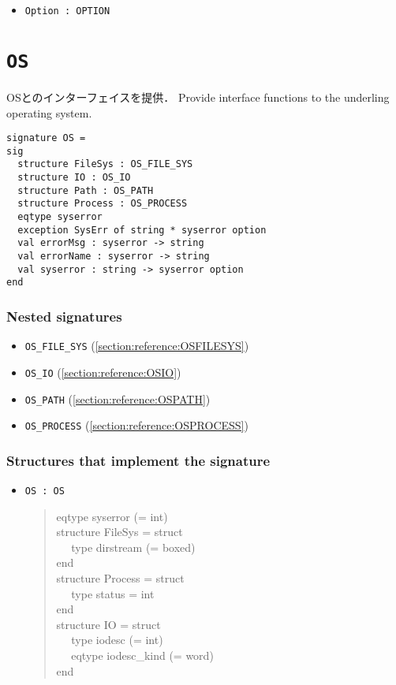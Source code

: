 \documentclass{jbook}
\newcommand{\txt}[2]{#2}
\newcommand{\code}[1]{\mbox{\large\tt #1}}
\newcommand{\myem}{\mbox{\ \ }}
\newenvironment{program}{\begin{quote}\begin{tt}}%
                        {\end{tt}\end{quote}}
\newcommand{\structure}[1]{
\section{{\tt #1}}\label{section:reference:#1}
}
\newcommand{\signature}[2]{
\section{{\tt #1}}\label{section:reference:#2}
}
\newcommand{\sigref}[1]{\ref{section:reference:#1}}
\newcommand{\Structure}{\subsubsection*{\txt{シグネチャを実装するストラクチャ}{Structures that implement the signature}}}
\newcommand{\NestedSignature}{\subsubsection*{\txt{ネストしたシグネチャ}{Nested signatures}}}
\begin{document}
\begin{itemize}
\item \code{Option : OPTION}
\end{itemize}

\signature{OS}{OS}
\ifjp%
	OSとのインターフェイスを提供．
\else%
	Provide interface functions to the underling operating system.
\fi%

\begin{verbatim}
signature OS =
sig
  structure FileSys : OS_FILE_SYS
  structure IO : OS_IO
  structure Path : OS_PATH
  structure Process : OS_PROCESS
  eqtype syserror
  exception SysErr of string * syserror option
  val errorMsg : syserror -> string
  val errorName : syserror -> string
  val syserror : string -> syserror option
end
\end{verbatim}

\NestedSignature
\begin{itemize}
\item 
\code{OS\_FILE\_SYS}
(\sigref{OSFILESYS})
\item 
\code{OS\_IO}
(\sigref{OSIO})
\item 
\code{OS\_PATH}
(\sigref{OSPATH})
\item 
\code{OS\_PROCESS}
(\sigref{OSPROCESS})
\end{itemize}

\Structure
\begin{itemize}
\item \code{OS : OS}
\begin{program}
  eqtype syserror (= int)
\\
  structure FileSys = struct
\\\myem
    type dirstream (= boxed)
\\
  end
\\
  structure Process = struct
\\\myem
     type status = int
\\
  end
\\
  structure IO = struct
\\\myem
     type iodesc (= int)
\\\myem
     eqtype iodesc\_kind (= word)
\\
  end
\end{program}
\end{itemize}
\end{document}
